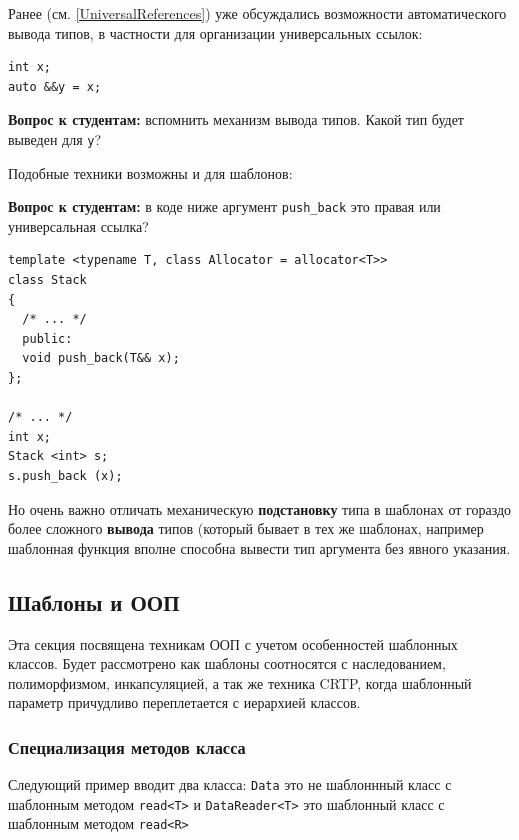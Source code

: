 \documentclass[a4paper,12pt,oneside]{article}
\newif\ifanswers
\begin{document}
Ранее (см. \ref{UniversalReferences}) уже обсуждались возможности автоматического вывода типов, в частности для организации универсальных ссылок:

\begin{lstlisting}
int x;
auto &&y = x;
\end{lstlisting}

\textbf{Вопрос к студентам:} вспомнить механизм вывода типов. Какой тип будет выведен для \lstinline!y!?

\ifanswers
Правильный ответ -- \lstinline!int&! так как для \lstinline!x! будет выведен тип \lstinline!int&!, а потом сработает свертывание ссылок.
\fi

Подобные техники возможны и для шаблонов:

\textbf{Вопрос к студентам:} в коде ниже аргумент \lstinline!push_back! это правая или универсальная ссылка?

\begin{lstlisting}
template <typename T, class Allocator = allocator<T>>
class Stack
{
  /* ... */
  public:
  void push_back(T&& x);
};

/* ... */
int x;
Stack <int> s;
s.push_back (x);
\end{lstlisting}

\ifanswers
Правильный ответ -- правая, так как вывод \lstinline!T! для вектора подставляется, а не выводится. Таким образом будет ошибка компиляции.
\fi

Но очень важно отличать механическую \textbf{подстановку} типа в шаблонах от гораздо более сложного \textbf{вывода} типов (который бывает в тех же шаблонах, например шаблонная функция вполне способна вывести тип аргумента без явного указания.

\pagebreak
\subsection{Шаблоны и ООП}

Эта секция посвящена техникам ООП с учетом особенностей шаблонных классов. Будет рассмотрено как шаблоны соотносятся с наследованием, полиморфизмом, инкапсуляцией, а так же техника CRTP, когда шаблонный параметр причудливо переплетается с иерархией классов.

\subsubsection{Специализация методов класса}\label{MemberSpec}

Следующий пример вводит два класса: \lstinline!Data! это не шаблоннный класс с шаблонным методом \lstinline!read<T>! и \lstinline!DataReader<T>! это шаблонный класс с шаблонным методом \lstinline!read<R>!
\end{document}
